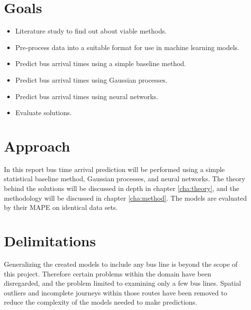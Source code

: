 \section{Goals}
\label{sec:aim}

\begin{itemize}[]
  \item Literature study to find out about viable methods.
  \item Pre-process data into a suitable format for use in machine learning models.
  \item Predict bus arrival times using a simple baseline method.
  \item Predict bus arrival times using Gaussian processes.
  \item Predict bus arrival times using neural networks.
  \item Evaluate solutions.
\end{itemize}

\section{Approach}
\label{sec:research-questions}

In this report bus time arrival prediction will be performed using a simple statistical baseline method, Gaussian processes, and neural networks. The theory behind the solutions will be discussed in depth in chapter \ref{cha:theory}, and the methodology will be discussed in chapter \ref{cha:method}. The models are evaluated by their MAPE on identical data sets.

\section{Delimitations}
\label{sec:delimitations}

Generalizing the created models to include any bus line is beyond the scope of this project. Therefore certain problems within the domain have been disregarded, and the problem limited to examining only a few bus lines. Spatial outliers and incomplete journeys within those routes have been removed to reduce the complexity of the models needed to make predictions.




